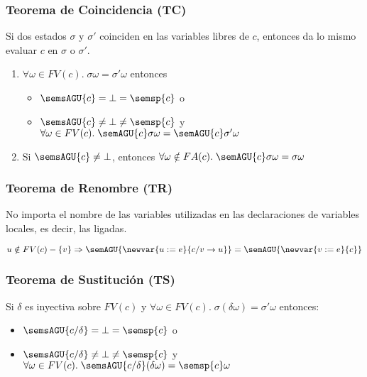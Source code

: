     \subsubsection*{Teorema de Coincidencia (TC)}
      \PN Si dos estados $\sigma$ y $\sigma'$ coinciden en las variables libres de $c$, entonces da lo mismo evaluar $c$ en $\sigma$ o $\sigma'$.
      \begin{enumerate}
        \item $\forall \omega \in FV(c) . \; \sigma \omega = \sigma' \omega$ entonces
          \begin{itemize}
            \item $\semsAGU{c} = \bot = \semsp{c}$ o
            \item $\semsAGU{c} \neq \bot \neq \semsp{c}$ y $\forall \omega \in FV(c) . \; \semAGU{c} \sigma \omega = \semAGU{c} \sigma' \omega$
          \end{itemize}
        \item Si $\semsAGU{c} \neq \bot$, entonces $\forall \omega \notin FA(c) . \; \semAGU{c} \sigma \omega = \sigma \omega$
      \end{enumerate}
  
    \subsubsection*{Teorema de Renombre (TR)}
      \PN No importa el nombre de las variables utilizadas en las declaraciones de variables locales, es decir, las ligadas.

      \vspace{3mm}
      \PN $u \notin FV(c) - \{v\} \Rightarrow \semAGU{\newvar{u := e}{c/v\rightarrow u}} = \semAGU{\newvar{v := e}{c}}$

    \subsubsection*{Teorema de Sustitución (TS)}
      \PN Si $\delta$ es inyectiva sobre $FV(c)$ y $\forall \omega \in FV(c) . \; \sigma(\delta \omega) = \sigma' \omega$ entonces:
      \begin{itemize}
        \item $\semsAGU{c/\delta} = \bot = \semsp{c}$ o
        \item $\semsAGU{c/\delta} \neq \bot \neq \semsp{c}$ y $\forall \omega \in FV(c) . \; \semsAGU{c/\delta} (\delta \omega) = \semsp{c} \omega$
      \end{itemize}
    
